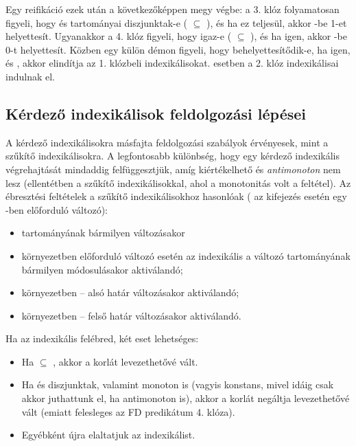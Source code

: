 Egy  reifikáció ezek után a következőképpen megy végbe: a
3. klóz folyamatosan figyeli, hogy  és  tartományai diszjunktak-e
( $\subseteq$ ), és ha ez teljesül, akkor -be
1-et helyettesít. Ugyanakkor a 4. klóz figyeli, hogy  igaz-e (
$\subseteq$ ), és ha igen, akkor -be 0-t helyettesít. Közben
egy külön démon figyeli, hogy  behelyettesítődik-e, ha igen, és ,
akkor elindítja az 1. klózbeli indexikálisokat.  esetben a 2. klóz
indexikálisai indulnak el.

\subsection{Kérdező indexikálisok feldolgozási lépései}

A kérdező indexikálisokra másfajta feldolgozási szabályok érvényesek, mint a
szűkítő indexikálisokra. A legfontosabb különbség, hogy egy kérdező indexikális
végrehajtását mindaddig felfüggesztjük, amíg kiértékelhető és \emph{antimonoton}
nem lesz (ellentétben a szűkítő indexikálisokkal, ahol a monotonitás volt a
feltétel). Az ébresztési feltételek a szűkítő indexikálisokhoz hasonlóak
( az  kifejezés esetén egy -ben előforduló változó):

\begin{itemize}
	\item {} tartományának bármilyen változásakor
        \item {} környezetben előforduló  változó esetén az
        indexikális a változó tartományának bármilyen módosulásakor
        aktiválandó; 
        \item {} környezetben -- alsó határ változásakor
        aktiválandó;
         \item
         környezetben -- felső határ változásakor aktiválandó.
\end{itemize}

Ha az indexikális felébred, két eset lehetséges:

\begin{itemize}
        \item Ha  $\subseteq$ , akkor a korlát levezethetővé vált.
        \item Ha   és  diszjunktak, valamint
         monoton is (vagyis konstans, mivel idáig csak akkor juthattunk el,
	ha antimonoton is), akkor a korlát negáltja levezethetővé vált (emiatt
        felesleges az  FD predikátum 4. klóza).
	\item Egyébként újra elaltatjuk az indexikálist. 
\end{itemize}


